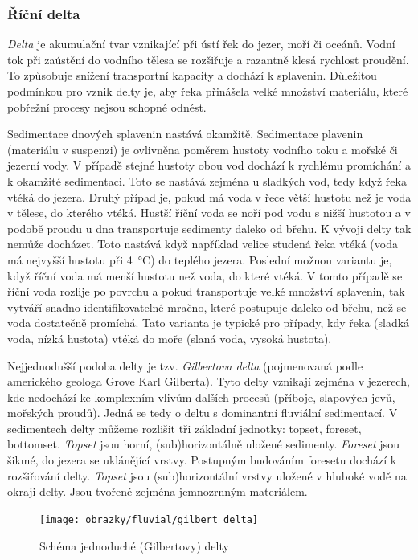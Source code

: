 \subsubsection{Říční delta}
\emph{Delta} je akumulační tvar vznikající při ústí řek do jezer, moří či oceánů. Vodní tok při zaústění do vodního tělesa se rozšiřuje a razantně klesá rychlost proudění. To způsobuje snížení transportní kapacity a dochází k splavenin. Důležitou podmínkou pro vznik delty je, aby řeka přinášela velké množství materiálu, které pobřežní procesy nejsou schopné odnést. 

Sedimentace dnových splavenin nastává okamžitě. Sedimentace plavenin (materiálu v suspenzi) je ovlivněna poměrem hustoty vodního toku a mořské či jezerní vody. V případě stejné hustoty obou vod dochází k rychlému promíchání a k okamžité sedimentaci. Toto se nastává zejména u sladkých vod, tedy když řeka vtéká do jezera. Druhý případ je, pokud má voda v řece větší hustotu než je voda v tělese, do kterého vtéká. Hustší říční voda se noří pod vodu s nižší hustotou a v podobě proudu u dna transportuje sedimenty daleko od břehu. K vývoji delty tak nemůže docházet. Toto nastává když například velice studená řeka vtéká (voda má nejvyšší hustotu při \SI{4}{\celsius}) do teplého jezera. Poslední možnou variantu je, když říční voda má menší hustotu než voda, do které vtéká. V tomto případě se říční voda rozlije po povrchu a pokud transportuje velké množství splavenin, tak vytváří snadno identifikovatelné mračno, které postupuje daleko od břehu, než se voda dostatečně promíchá. Tato varianta je typické pro případy, kdy řeka (sladká voda, nízká hustota) vtéká do moře (slaná voda, vysoká hustota).

Nejjednodušší podoba delty je tzv. \emph{Gilbertova delta} (pojmenovaná podle amerického geologa Grove Karl Gilberta). Tyto delty vznikají zejména v jezerech, kde nedochází ke komplexním vlivům dalších procesů (příboje, slapových jevů, mořských proudů). Jedná se tedy o deltu s dominantní fluviální sedimentací. V sedimentech delty můžeme rozlišit tři základní jednotky: topset, foreset, bottomset. \emph{Topset} jsou horní, (sub)horizontálně uložené sedimenty. \emph{Foreset} jsou šikmé, do jezera se uklánějící vrstvy. Postupným budováním foresetu dochází k rozšiřování delty. \emph{Topset} jsou (sub)horizontální vrstvy uložené v hluboké vodě na okraji delty. Jsou tvořené zejména jemnozrnným materiálem.

\begin{figure}[h]
	\centering
	\texttt{[image: obrazky/fluvial/gilbert\_delta]}
	\caption{Schéma jednoduché (Gilbertovy) delty}
	\label{fig:gilbertdelta}
\end{figure}

